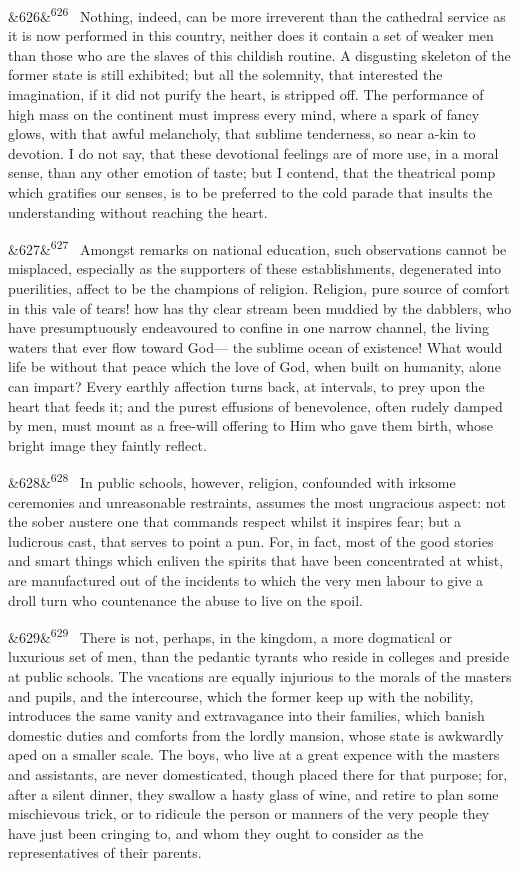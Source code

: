\documentclass[12pt]{article}
\newcommand{\para}[1][]{\par\noindent\ifx&#1&\else\textsuperscript{\footnotesize #1}~\fi}
\begin{document}
\para[626] Nothing, indeed, can be more irreverent than the cathedral service as it is now performed in this country, neither does it contain a set of weaker men than those who are the slaves of this childish routine. A disgusting skeleton of the former state is still exhibited; but all the solemnity, that interested the imagination, if it did not purify the heart, is stripped off. The performance of high mass on the continent must impress every mind, where a spark of fancy glows, with that awful melancholy, that sublime tenderness, so near a-kin to devotion. I do not say, that these devotional feelings are of more use, in a moral sense, than any other emotion of taste; but I contend, that the theatrical pomp which gratifies our senses, is to be preferred to the cold parade that insults the understanding without reaching the heart.

\para[627] Amongst remarks on national education, such observations cannot be misplaced, especially as the supporters of these establishments, degenerated into puerilities, affect to be the champions of religion. Religion, pure source of comfort in this vale of tears! how has thy clear stream been muddied by the dabblers, who have presumptuously endeavoured to confine in one narrow channel, the living waters that ever flow toward God--- the sublime ocean of existence! What would life be without that peace which the love of God, when built on humanity, alone can impart? Every earthly affection turns back, at intervals, to prey upon the heart that feeds it; and the purest effusions of benevolence, often rudely damped by men, must mount as a free-will offering to Him who gave them birth, whose bright image they faintly reflect.

\para[628] In public schools, however, religion, confounded with irksome ceremonies and unreasonable restraints, assumes the most ungracious aspect: not the sober austere one that commands respect whilst it inspires fear; but a ludicrous cast, that serves to point a pun. For, in fact, most of the good stories and smart things which enliven the spirits that have been concentrated at whist, are manufactured out of the incidents to which the very men labour to give a droll turn who countenance the abuse to live on the spoil.

\para[629] There is not, perhaps, in the kingdom, a more dogmatical or luxurious set of men, than the pedantic tyrants who reside in colleges and preside at public schools. The vacations are equally injurious to the morals of the masters and pupils, and the intercourse, which the former keep up with the nobility, introduces the same vanity and extravagance into their families, which banish domestic duties and comforts from the lordly mansion, whose state is awkwardly aped on a smaller scale. The boys, who live at a great expence with the masters and assistants, are never domesticated, though placed there for that purpose; for, after a silent dinner, they swallow a hasty glass of wine, and retire to plan some mischievous trick, or to ridicule the person or manners of the very people they have just been cringing to, and whom they ought to consider as the representatives of their parents.
\end{document}
